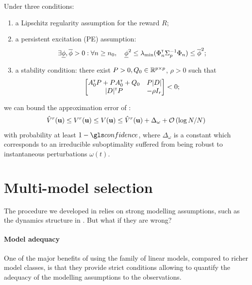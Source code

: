 \begin{theorem}
	\label{thm:control-error}
	\begin{leftbar}[theorembar]
	Under three conditions:
	\begin{enumerate}
		\item a Lipschitz regularity assumption for the reward $R$;
		\item a persistent excitation (PE) assumption:
		\begin{align*}
		\exists \underline{\phi},\overline{\phi}>0: \forall n\geq n_0,\quad \underline{\phi}^2 \leq \lambda_{\min}(\Phi_{n}^{\mathsf{\scriptscriptstyle T}}\Sigma_{p}^{-1}\Phi_{n}) \leq \overline{\phi}^2;
		\end{align*}
		\item a stability condition: there exist $P>0,Q_0\in\mathbb{R}^{p\times p}$, $\rho>0$ such that
		$$\begin{bmatrix}
		A_0^{\mathsf{\scriptscriptstyle T}} P + P A_0^{\mathsf{\scriptscriptstyle T}} + Q_0 & P|D|  \\
		|D|^{\mathsf{\scriptscriptstyle T}} P & -\rho I_r \\
		\end{bmatrix}< 0;$$
	\end{enumerate}
	we can bound the approximation error of :
	\begin{equation*}
	\hat{V}^r(\mathbf{u}) \leq {V}^r(\mathbf{u}) \leq V(\mathbf{u}) \leq \hat{V}^r(\mathbf{u}) + \Delta_\omega + \mathcal{O}\left({\log N / N}\right)
	\end{equation*}
	with probability at least $1-\confidence$, where $\Delta_\omega$ is a constant which corresponds to an irreducible suboptimality suffered from being robust to instantaneous perturbations $\omega(t)$.
	\end{leftbar}
\end{theorem}

\section{Multi-model selection}
\label{sec:multi-model}

The procedure we developed in  relies on strong modelling assumptions, such as the dynamics structure in . But what if they are wrong?

\paragraph{Model adequacy}

One of the major benefits of using the family of linear models, compared to richer model classes, is that they provide strict conditions allowing to quantify the adequacy of the modelling assumptions to the observations.

